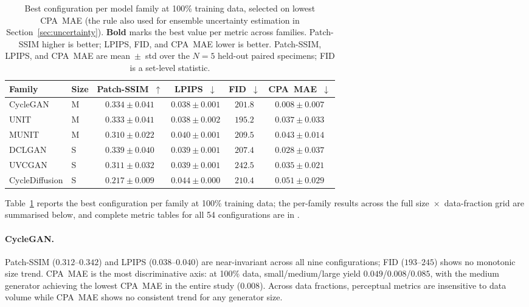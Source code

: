 \begin{table}[t]
\centering
\caption{Best configuration per model family at 100\% training data, selected on
lowest CPA~MAE (the rule also used for ensemble uncertainty estimation in
Section~\ref{sec:uncertainty}). \textbf{Bold} marks the best value per metric
across families. Patch-SSIM higher is better; LPIPS, FID, and CPA~MAE lower is
better. Patch-SSIM, LPIPS, and CPA~MAE are mean~$\pm$~std over the $N{=}5$
held-out paired specimens; FID is a set-level statistic.}
\label{tab:best_per_family}
\small
\begin{tabular}{llcccc}
\toprule
Family & Size & Patch-SSIM~$\uparrow$ & LPIPS~$\downarrow$ & FID~$\downarrow$ & CPA~MAE~$\downarrow$ \\
\midrule
CycleGAN       & M & $0.334 \pm 0.041$         & $\mathbf{0.038} \pm 0.001$ & $201.8$           & $\mathbf{0.008} \pm 0.007$ \\
UNIT           & M & $0.333 \pm 0.041$         & $\mathbf{0.038} \pm 0.002$ & $\mathbf{195.2}$  & $0.037 \pm 0.033$ \\
MUNIT          & M & $0.310 \pm 0.022$         & $0.040 \pm 0.001$         & $209.5$           & $0.043 \pm 0.014$ \\
DCLGAN         & S & $\mathbf{0.339} \pm 0.040$ & $0.039 \pm 0.001$         & $207.4$           & $0.028 \pm 0.037$ \\
UVCGAN         & S & $0.311 \pm 0.032$         & $0.039 \pm 0.001$         & $242.5$           & $0.035 \pm 0.021$ \\
CycleDiffusion & S & $0.217 \pm 0.009$         & $0.044 \pm 0.000$         & $210.4$           & $0.051 \pm 0.029$ \\
\bottomrule
\end{tabular}
\end{table}

Table~\ref{tab:best_per_family} reports the best configuration per family at 100\%
training data; the per-family results across the full size~$\times$~data-fraction
grid are summarised below, and complete metric tables for all 54 configurations are
in .

\paragraph{CycleGAN.}
Patch-SSIM ($0.312$--$0.342$) and LPIPS ($0.038$--$0.040$) are near-invariant across
all nine configurations; FID ($193$--$245$) shows no monotonic size trend.
CPA~MAE is the most discriminative axis: at 100\% data, small/medium/large yield
$0.049$/\allowbreak$0.008$/\allowbreak$0.085$, with the medium generator achieving the lowest CPA~MAE in the
entire study ($0.008$).
Across data fractions, perceptual metrics are insensitive to data volume while CPA~MAE
shows no consistent trend for any generator size.


